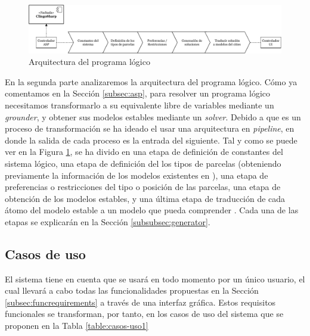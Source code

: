 \begin{figure}[!h]
	\centering
	\includegraphics[width=\textwidth]{images/arquitectura-asp}
	\caption{Arquitectura del programa lógico}
	\label{fig:arquitectura-asp}
\end{figure}

En la segunda parte analizaremos la arquitectura del programa lógico. Cómo ya comentamos en la Sección \ref{subsec:asp}, para resolver un programa lógico necesitamos transformarlo a su equivalente libre de variables mediante un \textit{grounder}, y obtener sus modelos estables mediante un \textit{solver}. Debido a que es un proceso de transformación se ha ideado el usar una arquitectura en \textit{pipeline}, en donde la salida de cada proceso es la entrada del siguiente. Tal y como se puede ver en la Figura \ref{fig:arquitectura-asp}, se ha divido en una etapa de definición de constantes del sistema lógico, una etapa de definición del los tipos de parcelas (obteniendo previamente la información de los modelos existentes en \cities), una etapa de preferencias o restricciones del tipo o posición de las parcelas, una etapa de obtención de los modelos estables, y una última etapa de traducción de cada átomo del modelo estable a un modelo que pueda comprender \cities. Cada una de las etapas se explicarán en la Sección \ref{subsubsec:generator}.

\subsection{Casos de uso}
\label{subsec:cases}

El sistema tiene en cuenta que se usará en todo momento por un único usuario, el cual llevará a cabo todas las funcionalidades propuestas en la Sección \ref{subsec:funcrequirements} a través de una interfaz gráfica. Estos requisitos funcionales se transforman, por tanto, en los casos de uso del sistema que se proponen en la Tabla \ref{table:casos-uso1}

